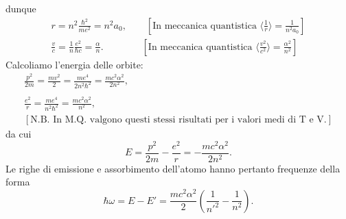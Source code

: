 \documentclass[a4paper,12pt,oneside]{book}
\begin{document}
dunque
\begin{eqnarray}
&r=n^2\frac{\hbar^2}{me^2}=n^2a_0, \qquad \left[\textrm{In meccanica quantistica } \langle \frac{1}{r}\rangle =\frac{1}{n^2 a_0}\right]& \\
&\frac{v}{c}=\frac{1}{n}\frac{e^2}{\hbar c}=\frac{\alpha}{n}. \qquad \qquad \left[\textrm{In meccanica quantistica } \langle \frac{v^2}{c^2}\rangle =\frac{\alpha ^2}{n^2}\right]&
\end{eqnarray}
Calcoliamo l'energia delle orbite:
\begin{eqnarray}
&\displaystyle{\frac{p^2}{2m}=\frac{mv^2}{2}=\frac{me^4}{2n^2\hbar ^2}=\frac{mc^2 \alpha ^2}{2n^2}} ,& \\
\nonumber \\
&\displaystyle{\frac{e^2}{r}=\frac{me^4}{n^2\hbar ^2}=\frac{mc^2 \alpha ^2}{n^2}} ,&\\
& \left[\textrm{N.B. In M.Q. valgono questi stessi risultati per i valori medi di T e V.}\right]& \nonumber
\end{eqnarray}
da cui
\begin{equation}
E=\frac{p^2}{2m}-\frac{e^2}{r}=-\frac{mc^2\alpha ^2}{2n^2}.
\end{equation}
Le righe di emissione e assorbimento dell'atomo hanno pertanto frequenze della forma
\begin{equation}
\hbar \omega =E-E' = \frac{mc^2\alpha ^2}{2} \left( \frac{1}{n'^2}-\frac{1}{n^2}\right).
\end{equation}
\end{document}
